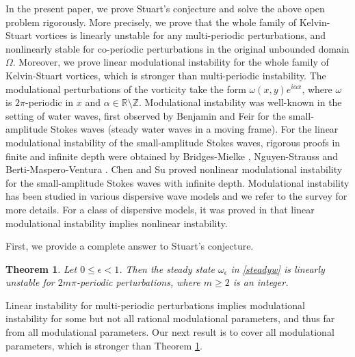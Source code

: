 \documentclass[1 [leqno, 11pt]{amsart}
\numberwithin{equation}{section}
\let\ep=\epsilon
\newtheorem{Theorem}{Theorem}[section]
\begin{document}
\begin{CJK*}{GBK}{song}
In the present paper, we prove Stuart's conjecture and solve  the above open problem rigorously.
More precisely,  we prove that the whole family of Kelvin-Stuart  vortices is
 linearly unstable for any multi-periodic  perturbations,
 and
 nonlinearly stable
for co-periodic perturbations in the original  unbounded domain $\Omega$.
Moreover, we prove linear modulational instability for the whole family of Kelvin-Stuart  vortices, which is stronger than multi-periodic instability. The modulational perturbations of the vorticity take the form ${\omega}(x, y) e^{i\alpha x}$, where $\omega$ is $2\pi$-periodic in $x$ and $\alpha \in \mathbb{R}\setminus\mathbb{Z}$.
Modulational instability was well-known in the setting of water waves, first observed by Benjamin and Feir \cite{Benjamin-Feir1967} for the small-amplitude Stokes waves (steady water waves in a moving frame). For  the linear modulational instability of the small-amplitude Stokes waves,   rigorous proofs in  finite and infinite depth  were obtained by Bridges-Mielke \cite{Bridges-Mielke1995}, Nguyen-Strauss \cite{Nguyen-Strauss2023} and Berti-Maspero-Ventura \cite{Berti-Maspero-Ventura2022}.
Chen and Su \cite{Chen-Su2020} proved  nonlinear modulational instability for the small-amplitude Stokes waves with infinite depth.
 Modulational instability has been studied  in various dispersive  wave models and we refer
to the  survey \cite{Bronski-Hur-Johnson2016} for more details. For a class of dispersive models, it was proved in \cite{Jin-Liao-Lin2019} that  linear   modulational instability implies nonlinear instability.

\medskip

 First, we provide a complete answer to Stuart's conjecture.

\begin{Theorem}\label{main result2-multi-periodic perturbations}
Let
$0 \leq \ep < 1$. Then the steady state $\omega_\ep$ in \eqref{steadyw} is linearly unstable for $2m\pi$-periodic perturbations, where $m\geq2$ is an integer.
\end{Theorem}


Linear instability for multi-periodic perturbations  implies modulational instability for some but not all rational modulational parameters, and thus far from all modulational  parameters. Our next  result is to cover all modulational parameters, which is stronger  than Theorem \ref{main result2-multi-periodic perturbations}.


\end{CJK*}
\end{document}

